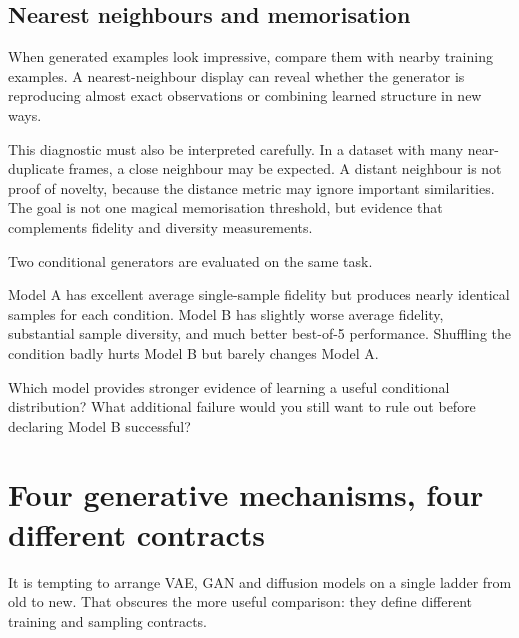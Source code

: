 \subsection{Nearest neighbours and memorisation}

When generated examples look impressive, compare them with nearby training examples. A nearest-neighbour display can reveal whether the generator is reproducing almost exact observations or combining learned structure in new ways.

This diagnostic must also be interpreted carefully. In a dataset with many near-duplicate frames, a close neighbour may be expected. A distant neighbour is not proof of novelty, because the distance metric may ignore important similarities. The goal is not one magical memorisation threshold, but evidence that complements fidelity and diversity measurements.

\begin{checkpointbox}
Two conditional generators are evaluated on the same task.

Model A has excellent average single-sample fidelity but produces nearly identical samples for each condition. Model B has slightly worse average fidelity, substantial sample diversity, and much better best-of-5 performance. Shuffling the condition badly hurts Model B but barely changes Model A.

Which model provides stronger evidence of learning a useful conditional distribution? What additional failure would you still want to rule out before declaring Model B successful?
\end{checkpointbox}

\section{Four generative mechanisms, four different contracts}

It is tempting to arrange VAE, GAN and diffusion models on a single ladder from old to new. That obscures the more useful comparison: they define different training and sampling contracts.

